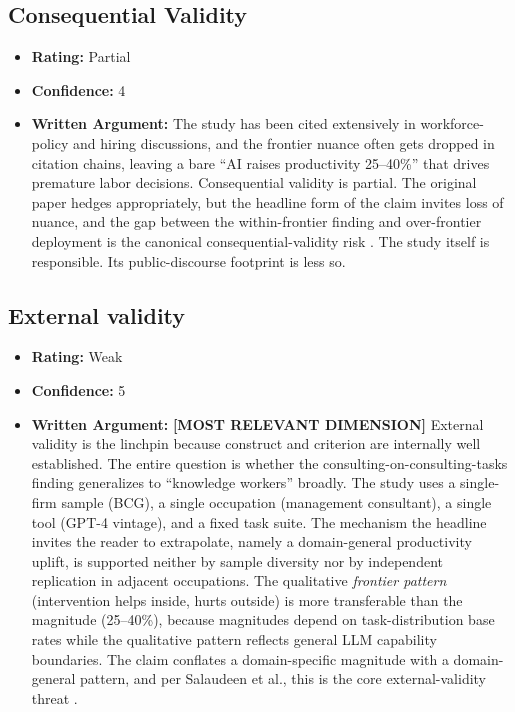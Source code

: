 \subsection{Consequential Validity}
\begin{itemize}
    \item \textbf{Rating:} Partial
    \item \textbf{Confidence:} 4
    \item \textbf{Written Argument:} The study has been cited extensively in workforce-policy and hiring discussions, and the frontier nuance often gets dropped in citation chains, leaving a bare ``AI raises productivity 25--40\%'' that drives premature labor decisions. Consequential validity is partial. The original paper hedges appropriately, but the headline form of the claim invites loss of nuance, and the gap between the within-frontier finding and over-frontier deployment is the canonical consequential-validity risk \citep{salaudeen2025measurement}. The study itself is responsible. Its public-discourse footprint is less so.
\end{itemize}

\subsection{External validity}
\begin{itemize}
    \item \textbf{Rating:} Weak
    \item \textbf{Confidence:} 5
    \item \textbf{Written Argument:} \textbf{[MOST RELEVANT DIMENSION]} External validity is the linchpin because construct and criterion are internally well established. The entire question is whether the consulting-on-consulting-tasks finding generalizes to ``knowledge workers'' broadly. The study uses a single-firm sample (BCG), a single occupation (management consultant), a single tool (GPT-4 vintage), and a fixed task suite. The mechanism the headline invites the reader to extrapolate, namely a domain-general productivity uplift, is supported neither by sample diversity nor by independent replication in adjacent occupations. The qualitative \emph{frontier pattern} (intervention helps inside, hurts outside) is more transferable than the magnitude (25--40\%), because magnitudes depend on task-distribution base rates while the qualitative pattern reflects general LLM capability boundaries. The claim conflates a domain-specific magnitude with a domain-general pattern, and per Salaudeen et al., this is the core external-validity threat \citep{salaudeen2025measurement}.
\end{itemize}


